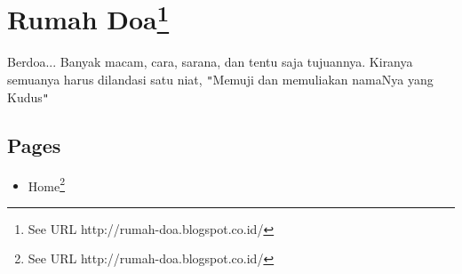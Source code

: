 







\chapter{
Rumah Doa\protect\footnote{See URL http://rumah-doa.blogspot.co.id/}}

\label{f0}



Berdoa...\newline
 Banyak macam, cara, sarana, dan tentu saja tujuannya. Kiranya semuanya harus dilandasi satu niat, \texttt{{}"{}}Memuji dan  memuliakan namaNya yang Kudus\texttt{{}"{}}
















\section{Pages}


\begin{itemize}\item Home\footnote{See URL http://rumah-doa.blogspot.co.id/}
\end{itemize}

